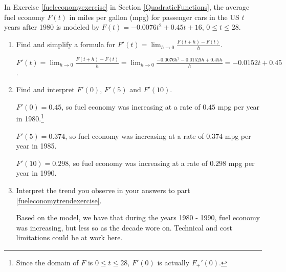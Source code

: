\documentclass{ximera}
\begin{document}
\begin{problem}
In Exercise \ref{fueleconomyexercise}  in Section \ref{QuadraticFunctions}, the average fuel economy $F(t)$ in miles per gallon (mpg) for passenger cars in the US $t$ years after 1980 is modeled by  $F(t) = -0.0076t^2+0.45t + 16$, $0 \leq t \leq 28$. 

\begin{enumerate}

\item  Find and simplify a formula for  $F'(t) = \lim_{h \rightarrow 0} \frac{F(t + h) - F(t)}{h}$.

\begin{solution}
$F'(t) = \lim_{h \rightarrow 0} \frac{F(t + h) - F(t)}{h} = \lim_{h \rightarrow 0} \frac{-0.0076h^{2} -0.0152th+0.45h}{h} =-0.0152t + 0.45$.
\end{solution}

\item\label{fueleconomytrendexercise}  Find and interpret $F'(0)$, $F'(5)$ and $F'(10)$.

\begin{solution}
$F'(0) = 0.45$, so fuel economy was increasing at a rate of $0.45$ mpg per year in 1980.\footnote{Since the domain of $F$ is $0 \leq t \leq 28$, $F'(0)$ is actually $F_{+}'(0)$.}

$F'(5) = 0.374$,  so fuel economy was increasing at a rate of $0.374$ mpg per year in 1985. 
 
$F'(10) = 0.298$,  so fuel economy was increasing at a rate of $0.298$ mpg  per year in 1990. 

\end{solution}

\item  Interpret the trend you observe in your answers to part \ref{fueleconomytrendexercise}.

\begin{solution}
Based on the model, we have that during the years 1980 - 1990, fuel economy was increasing, but less so as the decade wore on.  Technical and cost limitations could be at work here.
\end{solution}

\end{enumerate}

\end{problem}
\end{document}
